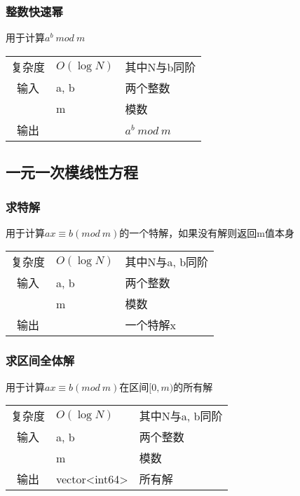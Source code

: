         \subsubsection{整数快速幂}\small
用于计算$a^{b} \ mod\ m$
\begin{longtable}{|c|l|l|}
复杂度 & $O(\log N)$ & 其中N与b同阶 \\
输入 & a, b & 两个整数 \\
 & m & 模数 \\
输出 &  & $a^{b} \ mod\ m$ \\
\end{longtable}



    \subsection{一元一次模线性方程}\small
        \subsubsection{求特解}\small
用于计算$ax \equiv b(mod\ m)$的一个特解，如果没有解则返回m值本身
\begin{longtable}{|c|l|l|}
复杂度 & $O(\log N)$ & 其中N与a, b同阶  \\
输入 & a, b & 两个整数 \\
 & m & 模数 \\
输出 &  & 一个特解x \\
\end{longtable}



        \subsubsection{求区间全体解}\small
用于计算$ax \equiv b(mod\ m)$在区间$[0, m)$的所有解
\begin{longtable}{|c|l|l|}
复杂度 & $O(\log N)$ & 其中N与a, b同阶  \\
输入 & a, b & 两个整数 \\
 & m & 模数 \\
输出 & vector<int64> & 所有解 \\
\end{longtable}



